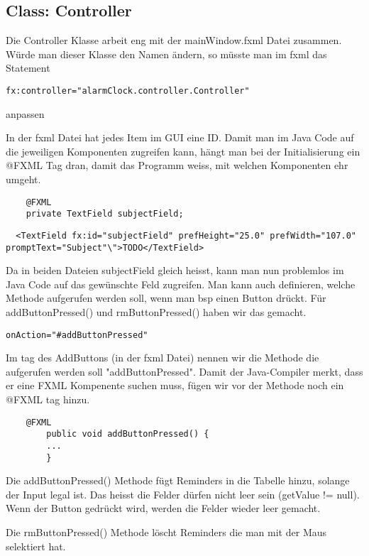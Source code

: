 \subsection{Class: Controller}
Die Controller Klasse arbeit eng mit der mainWindow.fxml Datei zusammen. Würde man dieser Klasse den Namen ändern, so müsste man im fxml das Statement
\begin{lstlisting}
fx:controller="alarmClock.controller.Controller"
\end{lstlisting}
anpassen

In der fxml Datei hat jedes Item im GUI eine ID. Damit man im Java Code auf die jeweiligen Komponenten zugreifen kann, hängt man bei der Initialisierung ein @FXML Tag dran, damit das Programm weiss, mit welchen Komponenten ehr umgeht.
\begin{lstlisting}
    @FXML
    private TextField subjectField;
\end{lstlisting}

\begin{lstlisting}
  <TextField fx:id="subjectField" prefHeight="25.0" prefWidth="107.0" promptText="Subject"\">TODO</TextField>
\end{lstlisting}

Da in beiden Dateien subjectField gleich heisst, kann man nun problemlos im Java Code auf das gewünschte Feld zugreifen.
Man kann auch definieren, welche Methode aufgerufen werden soll, wenn man bsp einen Button drückt. Für addButtonPressed() und rmButtonPressed() haben wir das gemacht.

\begin{lstlisting}
onAction="#addButtonPressed"
\end{lstlisting}

Im tag des AddButtons (in der fxml Datei) nennen wir die Methode die aufgerufen werden soll "addButtonPressed". Damit der Java-Compiler merkt, dass er eine FXML Kompenente suchen muss, fügen wir vor der Methode noch ein @FXML tag hinzu.
\begin{lstlisting}
    @FXML
        public void addButtonPressed() {
        ...
        }
\end{lstlisting}

Die addButtonPressed() Methode fügt Reminders in die Tabelle hinzu, solange der Input legal ist. Das heisst die Felder dürfen nicht leer sein (getValue != null). Wenn der Button gedrückt wird, werden die Felder wieder leer gemacht.


Die rmButtonPressed() Methode löscht Reminders die man mit der Maus selektiert hat.

